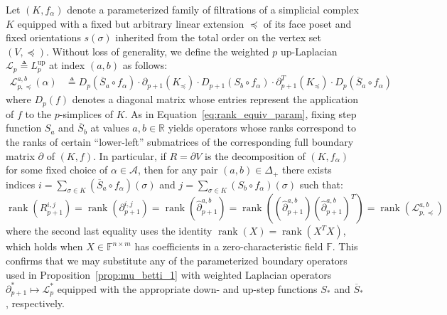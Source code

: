 \documentclass[pdflatex,sn-mathphys-num]{sn-jnl}
\begin{document}
Let \(\left( K,f_{\alpha} \right)\) denote a parameterized family of filtrations of a simplicial complex \(K\) equipped with a fixed but arbitrary linear extension \(\preceq\) of its face poset and fixed orientations \(s(\sigma)\) inherited from the total order on the vertex set \( (V, \preceq ) \). Without loss of generality, we define the weighted \(p\) up-Laplacian \(\mathcal{L}_{p} \triangleq L_{p}^{\operatorname{up}}\) at index \((a,b)\) as follows:
\[\begin{aligned}\label{eq:laplacian_decouple}
\mathcal{L}_{p, \preceq}^{a,b}(\alpha) & \triangleq D_{p}\left( {\overline{S}}_{a} \circ f_{\alpha} \right) \cdot \partial_{p + 1} \left( K_{\preceq} \right)  \cdot D_{p + 1}\left( S_{b} \circ f_{\alpha} \right) \cdot \partial_{p + 1}^{T} \left( K_{\preceq} \right)  \cdot D_{p}\left( {\overline{S}}_{a} \circ f_{\alpha} \right)
\end{aligned}
\]
where \(D_{p}(f)\) denotes a diagonal matrix whose entries represent the application of \(f\) to the \(p\)-simplices of \(K\). As in Equation~\ref{eq:rank_equiv_param}, fixing step function \(S_{a}\) and \({\overline{S}}_{b}\) at values \(a,b \in \mathbb{R}\) yields operators whose ranks correspond to the ranks of certain ``lower-left'' submatrices of the corresponding full boundary matrix \(\partial\) of \((K,f)\). In particular, if \(R = \partial V\) is the decomposition of \(\left( K,f_{\alpha} \right)\) for some fixed choice of \(\alpha \in \mathcal{A}\), then for any pair \((a,b) \in \Delta_{+}\) there exists indices \(i = \sum_{\sigma \in K}\left( {\overline{S}}_{a} \circ f_{\alpha} \right)(\sigma)\) and \(j = \sum_{\sigma \in K}\left( S_{b} \circ f_{\alpha} \right)(\sigma)\) such that:
\[
\operatorname{rank} \left( R_{p + 1}^{i,j} \right)  
	= \operatorname{rank} \left( \partial_{p + 1}^{i,j} \right)  = \operatorname{rank} \left( {\hat{\partial}}_{p + 1}^{a,b} \right)  
	= \operatorname{rank} \left(  \left( {\hat{\partial}}_{p + 1}^{a,b} \right)  \left( {\hat{\partial}}_{p + 1}^{a,b} \right) ^{T} \right)  
	= \operatorname{rank} \left( \mathcal{L}_{p, \preceq}^{a,b} \right) 
\]
where the second last equality uses the identity \(\operatorname{rank}(X) = \operatorname{rank} \left( X^{T}X \right) \), which holds when \(X \in \mathbb{F}^{n \times m}\) has coefficients in a zero-characteristic field \(\mathbb{F}\). This confirms that we may substitute any of the parameterized boundary operators used in Proposition~\ref{prop:mu_betti_1} with weighted Laplacian operators \(\partial_{p + 1}^{\ast} \mapsto \mathcal{L}_{p}^{\ast}\) equipped with the appropriate down- and up-step functions \(S_{\ast}\) and \({\overline{S}}_{\ast}\), respectively.
\end{document}
